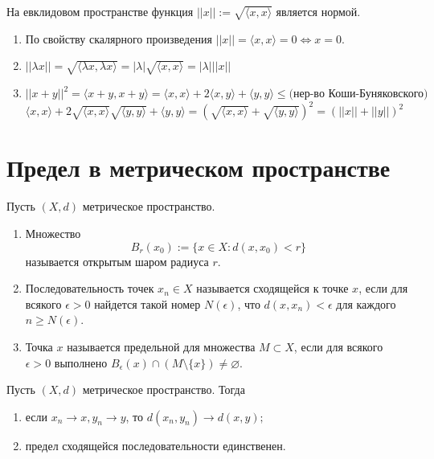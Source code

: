     \begin{corollary}
    	На евклидовом пространстве функция $||x|| := \sqrt{\langle x, x \rangle}$ является нормой.
    \end{corollary}
    
    \begin{enumerate}
    	\item По свойству скалярного произведения $||x|| = \langle x, x \rangle = 0 \Leftrightarrow x = 0$.
    	\item $||\lambda x|| = \sqrt{\langle \lambda x, \lambda x \rangle} = |\lambda| \sqrt{\langle x, x \rangle} = |\lambda| ||x||$
    	\item $||x + y||^2 = \langle x + y, x + y \rangle = \langle x, x \rangle + 2 \langle x, y \rangle + \langle y, y \rangle \leqslant \text{(нер-во Коши-Буняковского)}$ $\langle x, x \rangle + 2\sqrt{\langle x, x \rangle} \sqrt{\langle y, y \rangle} + \langle y, y \rangle = (\sqrt{\langle x, x \rangle} + \sqrt{\langle y, y \rangle})^2 = (||x|| + ||y||)^2$
    \end{enumerate}
    
    \section{Предел в метрическом пространстве}
    
    \begin{definition}
    	Пусть $(X, d)$ метрическое пространство.
    	\begin{enumerate}
    		\item Множество
    		\[ B_r(x_0) := \{x \in X: d(x, x_0) < r\} \]
    		называется открытым шаром радиуса $r$.
    		\item Последовательность точек $x_n \in X$ называется сходящейся к точке $x$, если для всякого $\epsilon > 0$ найдется такой номер $N(\epsilon)$, что $d(x, x_n) < \epsilon$ для каждого $n \geqslant N(\epsilon)$.
    		\item Точка $x$ называется предельной для множества $M \subset X$, если для всякого $\epsilon > 0$ выполнено $B_{\epsilon}(x) \cap (M \setminus \{x\}) \neq \varnothing.$
    	\end{enumerate}
    \end{definition}
    
    \begin{lemma}
    	Пусть $(X, d)$ метрическое пространство. Тогда
    	\begin{enumerate}
    		\item если $x_n \rightarrow x, y_n \rightarrow y$, то $d(x_n, y_n) \rightarrow d(x, y);$
    		\item предел сходящейся последовательности единственен.
    	\end{enumerate}
    \end{lemma}
    
